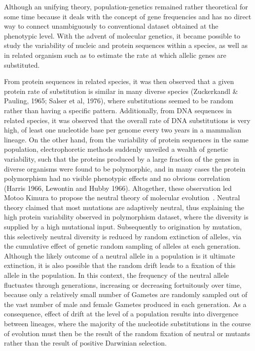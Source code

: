 Although an unifying theory, population-genetics remained rather theoretical for some time because it deals with the concept of gene frequencies and has no direct way to connect unambiguously to conventional dataset obtained at the phenotypic level.
With the advent of molecular genetics, it became possible to study the variability of nucleic and protein sequences within a species, as well as in related organism such as to estimate the rate at which allelic genes are substituted.

From protein sequences in related species, it was then observed that a given protein rate of \gls{substitution} is similar in many diverse species (Zuckerkandl \& Pauling, 1965; Salser et al, 1976), where \glspl{substitution} seemed to be random rather than having a specific pattern.
Additionally, from \acrshort{DNA} sequences in related species, it was observed that the overall rate of \acrshort{DNA} \glspl{substitution} is very high, of least one nucleotide base per genome every two years in a mammalian lineage.
On the other hand, from the variability of protein sequences in the same population, electrophoretic methods suddenly unveiled a wealth of genetic variability, such that the proteins produced by a large fraction of the genes in diverse organisms were found to be \gls{polymorphic}, and in many cases the protein polymorphism had no visible phenotypic effects and no obvious correlation (Harris 1966, Lewontin and Hubby 1966).
Altogether, these observation led Motoo Kimura to propose the \gls{neutral} theory of molecular evolution~\citep{kimura1968evolutionary,kimura1986dna, kimura1991neutral}.
Neutral theory claimed that most mutations are adaptively \gls{neutral}, thus explaining the high protein variability observed in polymorphism dataset, where the diversity is supplied by a high mutational input.
Subsequently to origination by mutation, this selectively \gls{neutral} diversity is reduced by random extinction of \glspl{allele}, via the cumulative effect of genetic random sampling of \glspl{allele} at each generation.
Although the likely outcome of a \gls{neutral} \gls{allele} in a population is it ultimate extinction, it is also possible that the random drift leads to a fixation of this \gls{allele} in the population.
In this context, the frequency of the \gls{neutral} \gls{allele} fluctuates through generations, increasing or decreasing fortuitously over time, because only a relatively small number of \glspl{Gamete} are randomly sampled out of the vast number of male and female \glspl{Gamete} produced in each generation.
As a consequence, effect of \gls{drift} at the level of a population results into divergence between lineages, where the majority of the nucleotide \glspl{substitution} in the course of evolution must then be the result of the random fixation of \gls{neutral} or mutants rather than the result of positive Darwinian selection.

